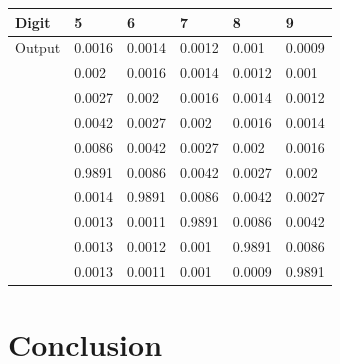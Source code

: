 \documentclass[letterpaper,11pt]{article}
\begin{document}
\begin{table}[H]
\begin{tabular}{l|lllll}
Digit  & 5                             & 6                             & 7                             & 8                             & 9                             \\ \hline
Output & 0.0016                        & 0.0014                        & 0.0012                        & 0.001                         & 0.0009                        \\
       & 0.002                         & 0.0016                        & 0.0014                        & 0.0012                        & 0.001                         \\
       & 0.0027                        & 0.002                         & 0.0016                        & 0.0014                        & 0.0012                        \\
       & 0.0042                        & 0.0027                        & 0.002                         & 0.0016                        & 0.0014                        \\
       & 0.0086                        & 0.0042                        & 0.0027                        & 0.002                         & 0.0016                        \\
       & {\color[HTML]{3531FF} 0.9891} & 0.0086                        & 0.0042                        & 0.0027                        & 0.002                         \\
       & 0.0014                        & {\color[HTML]{3531FF} 0.9891} & 0.0086                        & 0.0042                        & 0.0027                        \\
       & 0.0013                        & 0.0011                        & {\color[HTML]{3531FF} 0.9891} & 0.0086                        & 0.0042                        \\
       & 0.0013                        & 0.0012                        & 0.001                         & {\color[HTML]{3531FF} 0.9891} & 0.0086                        \\
       & 0.0013                        & 0.0011                        & 0.001                         & 0.0009                        & {\color[HTML]{3531FF} 0.9891}
\end{tabular}
\end{table}


\section{Conclusion}
\end{document}
